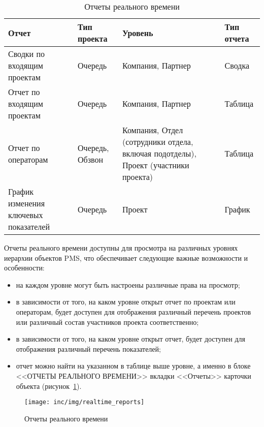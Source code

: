 \begin{table}[ht]
    \caption{Отчеты реального времени}
    \begin{small}
        \begin{tabular}{|p{}|p{}|p{}|p{}|}
            \hline
            Отчет & Тип проекта & Уровень & Тип отчета \\
            \hline
            Сводки по входящим проектам & Очередь & Компания, Партнер & Сводка  \\
            \hline
            Отчет по входящим проектам & Очередь & Компания, Партнер & Таблица  \\
            \hline
            Отчет по операторам & Очередь, Обзвон & Компания, Отдел (сотрудники отдела, включая подотделы), Проект (участники проекта) & Таблица  \\
            \hline
            График изменения ключевых показателей & Очередь & Проект & График  \\
            \hline
        \end{tabular}
    \end{small}
    \label{tab:orders}
\end{table}

Отчеты реального времени доступны для просмотра на различных уровнях иерархии объектов PMS, что обеспечивает следующие важные возможности и особенности:
\begin{itemize}
    \item на каждом уровне могут быть настроены различные права на просмотр;
    \item в зависимости от того, на каком уровне открыт отчет по проектам или операторам, будет доступен для отображения различный перечень проектов или различный состав участников проекта соответственно;
    \item в зависимости от того, на каком уровне открыт отчет, будет доступен для отображения различный перечень показателей;
    \item отчет можно найти на указанном в таблице выше уровне, а именно в блоке <<ОТЧЕТЫ РЕАЛЬНОГО ВРЕМЕНИ>> вкладки <<Отчеты>> карточки объекта (рисунок~\ref{pic:realtimereports}).
\end{itemize}

\begin{figure}[!ht]
    \texttt{[image: inc/img/realtime\_reports]}
    \caption{Отчеты реального времени}
    \label{pic:realtimereports}
\end{figure}

